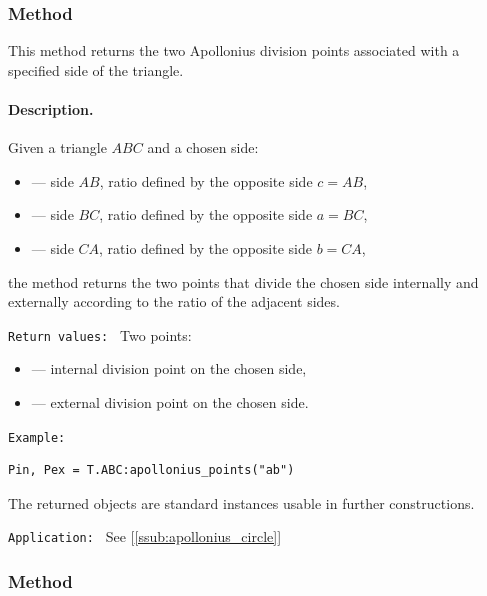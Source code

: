 \subsubsection{Method }
\label{ssub:apollonius_points}

This method returns the two Apollonius division points associated with a
specified side of the triangle.

\medskip

\paragraph{Description.}
Given a triangle $ABC$ and a chosen side:

\begin{itemize}
  \item {} — side $AB$, ratio defined by the opposite side $c = AB$,
  \item {} — side $BC$, ratio defined by the opposite side $a = BC$,
  \item {} — side $CA$, ratio defined by the opposite side $b = CA$,
\end{itemize}

the method  returns the two
points that divide the chosen side internally and externally according to the
ratio of the adjacent sides.

\medskip
\texttt{Return values: }
Two points:
\begin{itemize}
  \item {} — internal division point on the chosen side,
  \item {} — external division point on the chosen side.
\end{itemize}

\medskip

\texttt{Example: }
\begin{verbatim}
Pin, Pex = T.ABC:apollonius_points("ab")
\end{verbatim}

The returned objects are standard  instances usable in further
constructions.

\texttt{Application: } See [\ref{ssub:apollonius_circle}]


\subsubsection{Method }
\label{ssub:apollonius_point}

